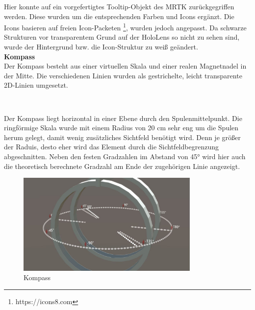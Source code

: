 Hier konnte auf ein vorgefertigtes Tooltip-Objekt des MRTK zurückgegriffen werden. Diese wurden um die entsprechenden Farben und Icons ergänzt. Die Icons basieren auf freien Icon-Packeten \footnote{https://icons8.com}, wurden jedoch angepasst. Da schwarze Strukturen vor transparentem Grund auf der HoloLens so nicht zu sehen sind, wurde der Hintergrund bzw. die Icon-Struktur zu weiß geändert.\\

\textbf{Kompass}\\
Der Kompass besteht aus einer virtuellen Skala und einer realen Magnetnadel in der Mitte. Die verschiedenen Linien wurden als gestrichelte, leicht transparente 2D-Linien umgesetzt.
\vspace{4px}
\begin{center}
	\\
\end{center}
\vspace{6px}

Der Kompass liegt horizontal in einer Ebene durch den Spulenmittelpunkt. Die ringförmige Skala wurde mit einem Radius von 20 cm sehr eng um die Spulen herum gelegt, damit wenig zusätzliches Sichtfeld benötigt wird. Denn je größer der Raduis, desto eher wird das Element durch die Sichtfeldbegrenzung abgeschnitten. Neben den festen Gradzahlen im Abstand von 45° wird hier auch die theoretisch berechnete Gradzahl am Ende der zugehörigen Linie angezeigt.\\

\begin{figure}[H]
	\centering
	\includegraphics[width=0.8\textwidth]{images/compass.jpg}
	\caption{Kompass}
	\label{img:compass}
\end{figure}

